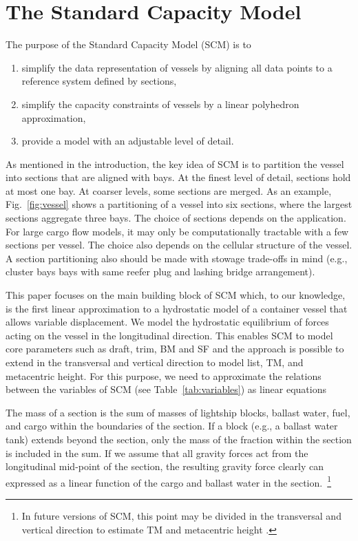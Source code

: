 \documentclass[runningheads]{llncs}
\begin{document}
\section{The Standard Capacity Model}

The purpose of the Standard Capacity Model (SCM) is to
\begin{enumerate}
\item simplify the data representation of vessels by aligning all data points to a reference system defined by sections,
\item simplify the capacity constraints of vessels by a linear polyhedron approximation,
\item provide a model with an adjustable level of detail.  
\end{enumerate}

As mentioned in the introduction, the key idea of SCM is to partition the vessel into sections that are aligned with bays. At the finest level of detail, sections hold at most one bay. At coarser levels, some sections are merged. As an example, Fig.~\ref{fig:vessel} shows a partitioning of a vessel into six sections, where the largest sections aggregate three bays. The choice of sections depends on the application. For large cargo flow models, it may only be computationally tractable with a few sections per vessel. The choice also depends on the cellular structure of the vessel. A section partitioning also should be made with stowage trade-offs in mind (e.g., cluster bays bays with same reefer plug and lashing bridge arrangement).

This paper focuses on the main building block of SCM which, to our knowledge, is the first linear approximation to a hydrostatic model of a container vessel that allows variable displacement. We model the hydrostatic equilibrium of forces acting on the vessel in the longitudinal direction. This enables SCM to model core parameters such as draft, trim, BM and SF and the approach is possible to extend in the transversal and vertical direction to model list, TM, and metacentric height. For this purpose, we need to approximate the relations between the variables of SCM (see Table~\ref{tab:variables}) as linear equations
  
The mass of a section is the sum of masses of lightship blocks, ballast water, fuel, and cargo within the boundaries of the section. If a block (e.g., a ballast water tank) extends beyond the section, only the mass of the fraction within the section is included in the sum. If we assume that all gravity forces act from the longitudinal mid-point of the section, the resulting gravity force clearly can expressed as a linear function of the cargo and ballast water in the section.~\footnote{In future versions of SCM, this point may be divided in the transversal and vertical direction to estimate TM and metacentric height .}    
\end{document}
